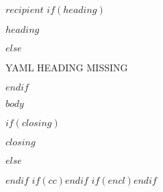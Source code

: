 \documentclass[$if(dept)$$dept$$else$iss$endif$,$if(language)$english$else$norsk$endif$]{xeuioletter2}
\begin{document}
\begin{letter}{$recipient$}
$if(heading)$\opening{$heading$}$else$\opening{YAML HEADING MISSING}$endif$

$body$

$if(closing)$\closing{$closing$}$else$\closing{}$endif$
$if(cc)$$endif$
$if(encl)$$endif$

\end{letter}
\end{document}

